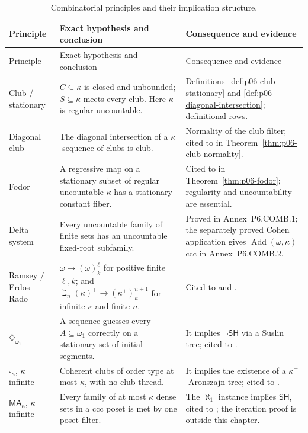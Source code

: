 \begingroup\footnotesize
\begin{longtable}{@{}p{}p{}p{}@{}}
\caption{Combinatorial principles and their implication structure.}\label{tab:p06-combinatorial-principles}\\
\toprule
Principle & Exact hypothesis and conclusion & Consequence and evidence \\
\midrule
\endfirsthead
\toprule
Principle & Exact hypothesis and conclusion & Consequence and evidence \\
\midrule
\endhead
Club / stationary &
\(C\subseteq\kappa\) is closed and unbounded; \(S\subseteq\kappa\) meets
every club.  Here \(\kappa\) is regular uncountable. &
Definitions~\ref{def:p06-club-stationary} and
\ref{def:p06-diagonal-intersection}; definitional rows. \\
\addlinespace
Diagonal club &
The diagonal intersection of a \(\kappa\)-sequence of clubs is club. &
Normality of the club filter; cited to \textcite{Jech2003} in
Theorem~\ref{thm:p06-club-normality}. \\
\addlinespace
Fodor &
A regressive map on a stationary subset of regular uncountable \(\kappa\)
has a stationary constant fiber. &
Cited to \textcite{Fodor1956} in Theorem~\ref{thm:p06-fodor}; regularity and
uncountability are essential. \\
\addlinespace
Delta system &
Every uncountable family of finite sets has an uncountable fixed-root
subfamily. &
Proved in Annex~P6.COMB.1; the separately proved Cohen application gives
\(\operatorname{Add}(\omega,\kappa)\) ccc in Annex~P6.COMB.2. \\
\addlinespace
Ramsey / Erdos--Rado &
\(\omega\longrightarrow(\omega)^\ell_k\) for positive finite \(\ell,k\); and
\(\beth_n(\kappa)^+\longrightarrow(\kappa^+)^{n+1}_\kappa\) for infinite
\(\kappa\) and finite \(n\). &
Cited to \textcite{Ramsey1930} and \textcite{ErdosRado1956}. \\
\addlinespace
\(\diamondsuit_{\omega_1}\) &
A sequence guesses every \(A\subseteq\omega_1\) correctly on a stationary
set of initial segments. &
It implies \(\neg\mathsf{SH}\) via a Suslin tree; cited to
\textcite{Jensen1972FineStructure}. \\
\addlinespace
\(\square_\kappa\), \(\kappa\) infinite &
Coherent clubs of order type at most \(\kappa\), with no club thread. &
It implies the existence of a \(\kappa^+\)-Aronszajn tree; cited to
\textcite{Jensen1972FineStructure}. \\
\addlinespace
\(\mathsf{MA}_\kappa\), \(\kappa\) infinite &
Every family of at most \(\kappa\) dense sets in a ccc poset is met by one
poset filter. &
The \(\aleph_1\) instance implies \(\mathsf{SH}\), cited to
\textcite{MartinSolovay1970}; the iteration proof is outside this chapter. \\
\bottomrule
\end{longtable}
\endgroup

